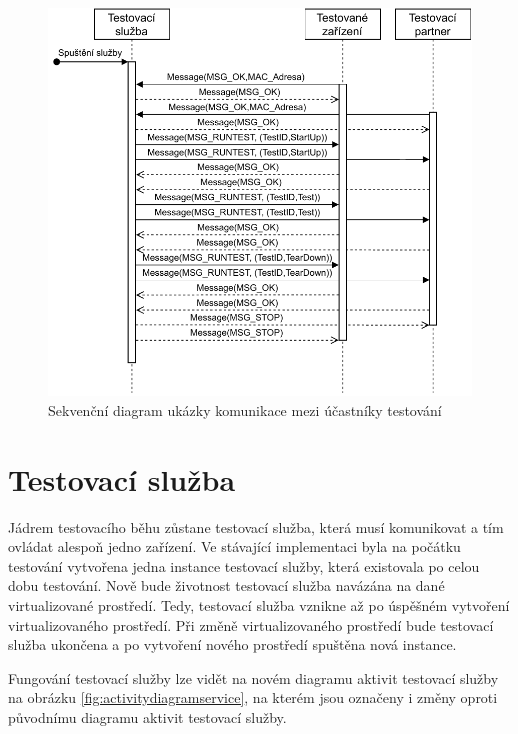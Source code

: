 \begin{figure}[htbp]
    \centering 
    \includegraphics[width=\textwidth]{assets/img/bp_assets/sequencediagram.pdf}
    \caption{Sekvenční diagram ukázky komunikace mezi účastníky testování}
    \label{fig:seqdiag}
\end{figure}

\section{Testovací služba}

Jádrem testovacího běhu zůstane testovací služba, která musí komunikovat a tím ovládat alespoň jedno zařízení. Ve stávající implementaci byla na počátku testování vytvořena jedna instance testovací služby, která existovala po celou dobu testování. Nově bude životnost testovací služba navázána na dané virtualizované prostředí. Tedy, testovací služba vznikne až po úspěšném vytvoření virtualizovaného prostředí. Při změně virtualizovaného prostředí bude testovací služba ukončena a po vytvoření nového prostředí spuštěna nová instance.

Fungování testovací služby lze vidět na novém diagramu aktivit testovací služby na obrázku \ref{fig:activitydiagramservice}, na kterém jsou označeny i změny oproti původnímu diagramu aktivit testovací služby.

